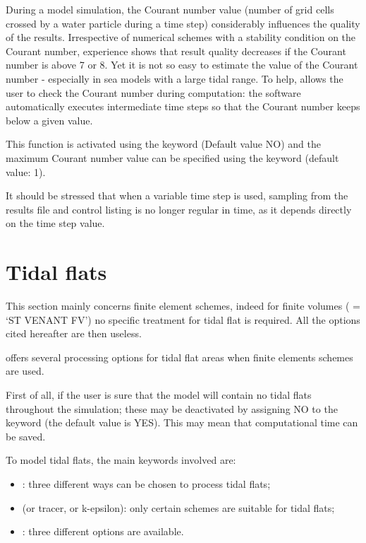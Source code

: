  During a model simulation, the Courant number value (number of grid cells crossed by a water particle during a time step) considerably influences the quality of the results. Irrespective of numerical schemes with a stability condition on the Courant number, experience shows that result quality decreases if the Courant number is above 7 or 8. Yet it is not so easy to estimate the value of the Courant number - especially in sea models with a large tidal range. To help,  allows the user to check the Courant number during computation: the software automatically executes intermediate time steps so that the Courant number keeps below a given value.

 This function is activated using the keyword  (Default value NO) and the maximum Courant number value can be specified using the keyword  (default value: 1).

 It should be stressed that when a variable time step is used, sampling from the results file and control listing is no longer regular in time, as it depends directly on the time step value.


\section{ Tidal flats}
This section mainly concerns finite element schemes, indeed for finite volumes ( = `ST VENANT FV') no specific treatment for tidal flat is required.
All the options cited hereafter are then useless. 

 offers several processing options for tidal flat areas when finite elements schemes are used. 

 First of all, if the user is sure that the model will contain no tidal flats throughout the simulation; these may be deactivated by assigning NO to the keyword  (the default value is YES). This may mean that computational time can be saved.

To model tidal flats, the main keywords involved are:
\begin{itemize}
\item {}: three different ways can be chosen to process tidal flats;
\item {} (or tracer, or k-epsilon): only certain schemes are suitable for tidal flats;
\item {}: three different options are available.
\end{itemize}

